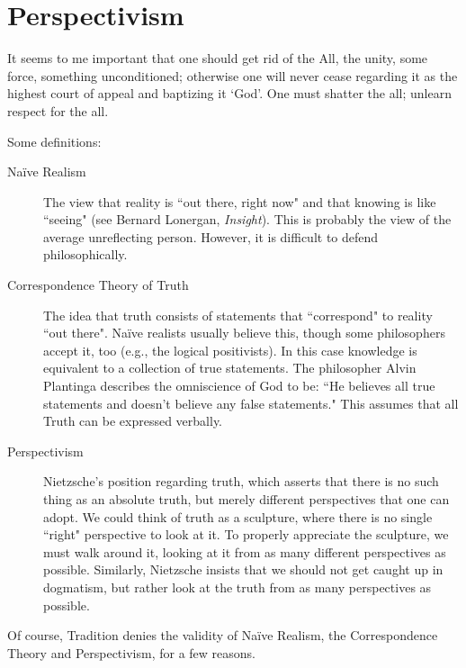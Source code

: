 \section{Perspectivism}

\begin{quotex}
It seems to me important that one should get rid of the All, the unity, some force, something unconditioned; otherwise one will never cease regarding it as the highest court of appeal and baptizing it `God'. One must shatter the all; unlearn respect for the all.

\end{quotex}
Some definitions:

\begin{description}
\item[Naïve Realism ]

The view that reality is ``out there, right now" and that knowing is like ``seeing" (see Bernard Lonergan, \emph{Insight}). This is probably the view of the average unreflecting person. However, it is difficult to defend philosophically. 

\item[Correspondence Theory of Truth ]

The idea that truth consists of statements that ``correspond" to reality ``out there". Naïve realists usually believe this, though some philosophers accept it, too (e.g., the logical positivists). In this case knowledge is equivalent to a collection of true statements. The philosopher Alvin Plantinga describes the omniscience of God to be: ``He believes all true statements and doesn't believe any false statements." This assumes that all Truth can be expressed verbally. 

\item[Perspectivism ]

Nietzsche's position regarding truth, which asserts that there is no such thing as an absolute truth, but merely different perspectives that one can adopt. We could think of truth as a sculpture, where there is no single ``right" perspective to look at it. To properly appreciate the sculpture, we must walk around it, looking at it from as many different perspectives as possible. Similarly, Nietzsche insists that we should not get caught up in dogmatism, but rather look at the truth from as many perspectives as possible. 

\end{description}
Of course, Tradition denies the validity of Naïve Realism, the Correspondence Theory and Perspectivism, for a few reasons.

